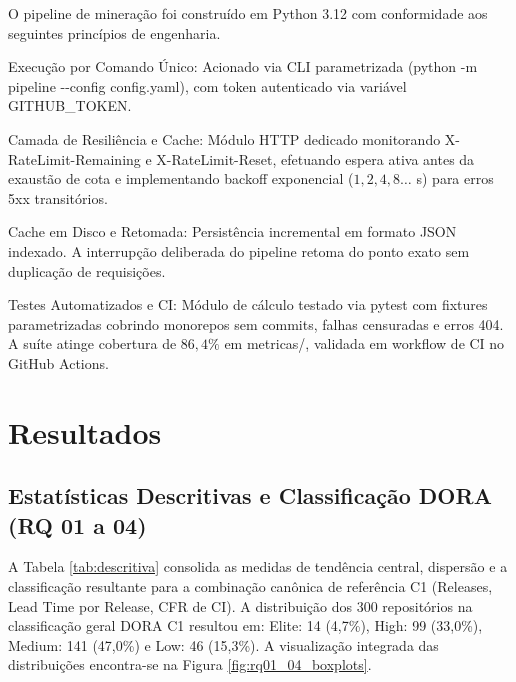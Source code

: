 \documentclass[12pt]{article}
\begin{document}
O pipeline de mineração foi construído em Python 3.12 com conformidade aos seguintes princípios de engenharia.

Execução por Comando Único: Acionado via CLI parametrizada (python -m pipeline -{}-config config.yaml), com token autenticado via variável GITHUB\_TOKEN.

Camada de Resiliência e Cache: Módulo HTTP dedicado monitorando X-RateLimit-Remaining e X-RateLimit-Reset, efetuando espera ativa antes da exaustão de cota e implementando backoff exponencial ($1, 2, 4, 8\dots$ s) para erros 5xx transitórios.

Cache em Disco e Retomada: Persistência incremental em formato JSON indexado. A interrupção deliberada do pipeline retoma do ponto exato sem duplicação de requisições.

Testes Automatizados e CI: Módulo de cálculo testado via pytest com fixtures parametrizadas cobrindo monorepos sem commits, falhas censuradas e erros 404. A suíte atinge cobertura de $86{,}4\%$ em metricas/, validada em workflow de CI no GitHub Actions.

\section{Resultados}
\label{sec:resultados}

\subsection{Estatísticas Descritivas e Classificação DORA (RQ 01 a 04)}

A Tabela \ref{tab:descritiva} consolida as medidas de tendência central, dispersão e a classificação resultante para a combinação canônica de referência C1 (Releases, Lead Time por Release, CFR de CI). A distribuição dos 300 repositórios na classificação geral DORA C1 resultou em: Elite: 14 (4,7\%), High: 99 (33,0\%), Medium: 141 (47,0\%) e Low: 46 (15,3\%). A visualização integrada das distribuições encontra-se na Figura \ref{fig:rq01_04_boxplots}.
\end{document}
